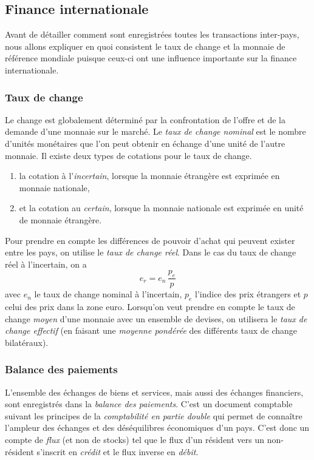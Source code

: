 
\subsection{Finance internationale} %
\label{sub:finance_internationale}
Avant de détailler comment sont enregistrées toutes les transactions inter-pays,
nous allons expliquer en quoi consistent le taux de change et la monnaie de référence mondiale
puisque ceux-ci ont une influence importante sur la finance internationale.

\subsubsection{Taux de change} %
\label{ssub:taux_de_change}
Le change est globalement déterminé par la confrontation de l'offre et
de la demande d'une monnaie sur le marché.
Le \emph{taux de change nominal} est le nombre d'unités monétaires que l'on 
peut obtenir en échange d'une unité de l'autre monnaie.
Il existe deux types de cotations pour le taux de change.
\begin{enumerate}
  \item la cotation à l'\emph{incertain}, lorsque la monnaie étrangère 
  est exprimée en monnaie nationale, %
  \item et la cotation au \emph{certain}, lorsque la monnaie nationale est exprimée
  en unité de monnaie étrangère. %
\end{enumerate}
Pour prendre en compte les différences de pouvoir d'achat qui peuvent exister entre les pays,
on utilise le \emph{taux de change réel}.
Dans le cas du taux de change réel à l'incertain, on a
\[
  e_r = e_n \, \frac{p_e}{p}
\]
avec $e_n$ le taux de change nominal à l'incertain, $p_e$ l'indice des prix étrangers
et $p$ celui des prix dans la zone euro.
Lorsqu'on veut prendre en compte le taux de change \emph{moyen} d'une monnaie
avec un ensemble de devises, on utilisera le \emph{taux de change effectif}
(en faisant une \emph{moyenne pondérée} des différents taux de change bilatéraux).


\subsubsection{Balance des paiements} %
\label{ssub:balance_des_paiements}
L'ensemble des échanges de biens et services, mais aussi des échanges financiers,
sont enregistrés dans la \emph{balance des paiements}.
C'est un document comptable suivant les principes de la \emph{comptabilité en partie double}
qui permet de connaître l'ampleur des échanges et des déséquilibres économiques d'un pays.
C'est donc un compte de \emph{flux} (et non de stocks) tel que le flux d'un résident vers 
un non-résident s'inscrit en \emph{crédit} et le flux inverse en \emph{débit}.

